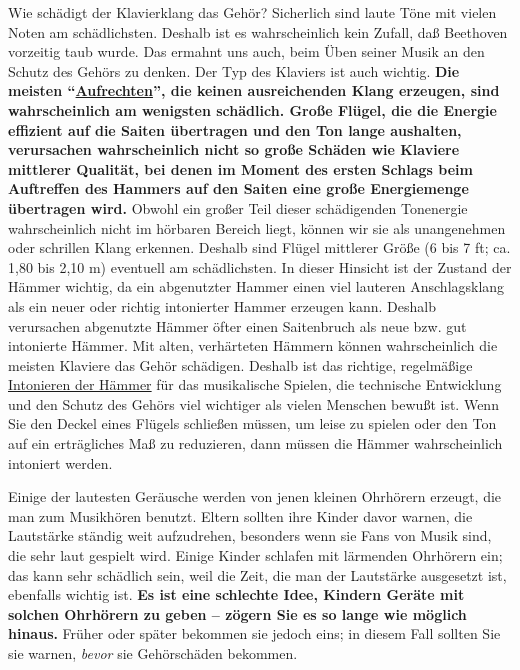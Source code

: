 Wie schädigt der Klavierklang das Gehör?
Sicherlich sind laute Töne mit vielen Noten am schädlichsten.
Deshalb ist es wahrscheinlich kein Zufall, daß Beethoven vorzeitig taub wurde.
Das ermahnt uns auch, beim Üben seiner Musik an den Schutz des Gehörs zu denken.
Der Typ des Klaviers ist auch wichtig.
\textbf{Die meisten \enquote{\hyperref[upright]{Aufrechten}}, die keinen ausreichenden Klang erzeugen, sind wahrscheinlich am wenigsten schädlich.
Große Flügel, die die Energie effizient auf die Saiten übertragen und den Ton lange aushalten, verursachen wahrscheinlich nicht so große Schäden wie Klaviere mittlerer Qualität, bei denen im Moment des ersten Schlags beim Auftreffen des Hammers auf den Saiten eine große Energiemenge übertragen wird.}
Obwohl ein großer Teil dieser schädigenden Tonenergie wahrscheinlich nicht im hörbaren Bereich liegt, können wir sie als unangenehmen oder schrillen Klang erkennen.
Deshalb sind Flügel mittlerer Größe (6 bis 7 ft; ca. 1,80 bis 2,10 m) eventuell am schädlichsten.
In dieser Hinsicht ist der Zustand der Hämmer wichtig, da ein abgenutzter Hammer einen viel lauteren Anschlagsklang als ein neuer oder richtig intonierter Hammer erzeugen kann.
Deshalb verursachen abgenutzte Hämmer öfter einen Saitenbruch als neue bzw. gut intonierte Hämmer.
Mit alten, verhärteten Hämmern können wahrscheinlich die meisten Klaviere das Gehör schädigen.
Deshalb ist das richtige, regelmäßige \hyperref[c2_7_hamm]{Intonieren der Hämmer} für das musikalische Spielen, die technische Entwicklung und den Schutz des Gehörs viel wichtiger als vielen Menschen bewußt ist.
Wenn Sie den Deckel eines Flügels schließen müssen, um leise zu spielen oder den Ton auf ein erträgliches Maß zu reduzieren, dann müssen die Hämmer wahrscheinlich intoniert werden.

Einige der lautesten Geräusche werden von jenen kleinen Ohrhörern erzeugt, die man zum Musikhören benutzt.
Eltern sollten ihre Kinder davor warnen, die Lautstärke ständig weit aufzudrehen, besonders wenn sie Fans von Musik sind, die sehr laut gespielt wird.
Einige Kinder schlafen mit lärmenden Ohrhörern ein; das kann sehr schädlich sein, weil die Zeit, die man der Lautstärke ausgesetzt ist, ebenfalls wichtig ist.
\textbf{Es ist eine schlechte Idee, Kindern Geräte mit solchen Ohrhörern zu geben -- zögern Sie es so lange wie möglich hinaus.}
Früher oder später bekommen sie jedoch eins; in diesem Fall sollten Sie sie warnen, \textit{bevor} sie Gehörschäden bekommen.


